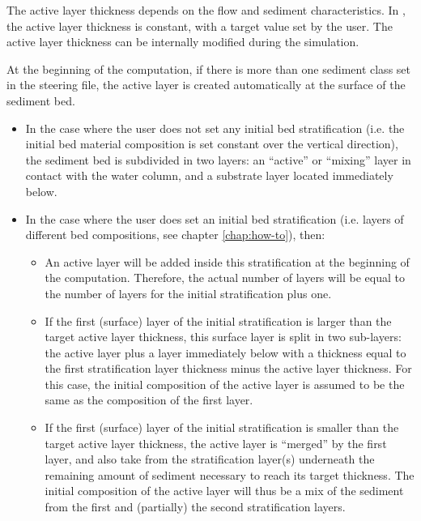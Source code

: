 The active layer thickness depends on the flow and sediment characteristics. In \gaia{}, the active layer thickness is constant, with a target value set by the user. The active layer thickness can be internally modified during the simulation.

At the beginning of the computation, if there is more than one sediment class set in the steering file, the active layer is created automatically at the surface of the sediment bed.

\begin{itemize}
\item In the case where the user does not set any initial bed stratification (i.e. the initial bed material composition is set constant over the vertical direction), the sediment bed is subdivided in two layers: an ``active'' or ``mixing'' layer in contact with the water column, and a substrate layer located immediately below.
\item In the case where the user does set an initial bed stratification (i.e. layers of different bed compositions, see chapter \ref{chap:how-to}), then:
  \begin{itemize}
  \item An active layer will be added inside this stratification at the beginning of the computation. Therefore, the actual number of layers will be equal to the number of layers for the initial stratification plus one.
  \item If the first (surface) layer of the initial stratification is larger than the target active layer thickness, this surface layer is split in two sub-layers: the active layer plus a layer immediately below with a thickness equal to the first stratification layer thickness minus the active layer thickness. For this case, the initial composition of the active layer is assumed to be the same as the composition of the first layer.
  \item If the first (surface) layer of the initial stratification is smaller than the target active layer thickness, the active layer is ``merged'' by the first layer, and also take from the stratification layer(s) underneath the remaining amount of sediment necessary to reach its target thickness. The initial composition of the active layer will thus be a mix of the sediment from the first and (partially) the second stratification layers.
  \end{itemize}
\end{itemize}

